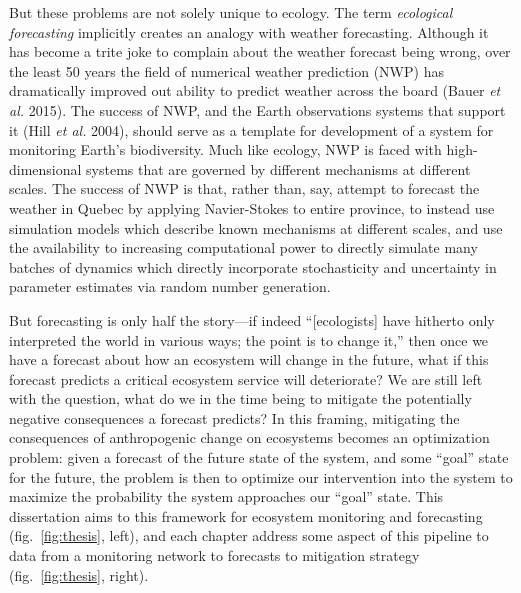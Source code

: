 \documentclass[10pt,oneside]{article}
\begin{document}
But these problems are not solely unique to ecology. The term
\emph{ecological forecasting} implicitly creates an analogy with weather
forecasting. Although it has become a trite joke to complain about the
weather forecast being wrong, over the least 50 years the field of
numerical weather prediction (NWP) has dramatically improved out ability
to predict weather across the board (Bauer \emph{et al.} 2015). The
success of NWP, and the Earth observations systems that support it (Hill
\emph{et al.} 2004), should serve as a template for development of a
system for monitoring Earth's biodiversity. Much like ecology, NWP is
faced with high-dimensional systems that are governed by different
mechanisms at different scales. The success of NWP is that, rather than,
say, attempt to forecast the weather in Quebec by applying Navier-Stokes
to entire province, to instead use simulation models which describe
known mechanisms at different scales, and use the availability to
increasing computational power to directly simulate many batches of
dynamics which directly incorporate stochasticity and uncertainty in
parameter estimates via random number generation.

But forecasting is only half the story---if indeed ``{[}ecologists{]}
have hitherto only interpreted the world in various ways; the point is
to change it,'' then once we have a forecast about how an ecosystem will
change in the future, what if this forecast predicts a critical
ecosystem service will deteriorate? We are still left with the question,
what do we in the time being to mitigate the potentially negative
consequences a forecast predicts? In this framing, mitigating the
consequences of anthropogenic change on ecosystems becomes an
optimization problem: given a forecast of the future state of the
system, and some ``goal'' state for the future, the problem is then to
optimize our intervention into the system to maximize the probability
the system approaches our ``goal'' state. This dissertation aims to this
framework for ecosystem monitoring and forecasting
(fig.~\ref{fig:thesis}, left), and each chapter address some aspect of
this pipeline to data from a monitoring network to forecasts to
mitigation strategy (fig.~\ref{fig:thesis}, right).
\end{document}
